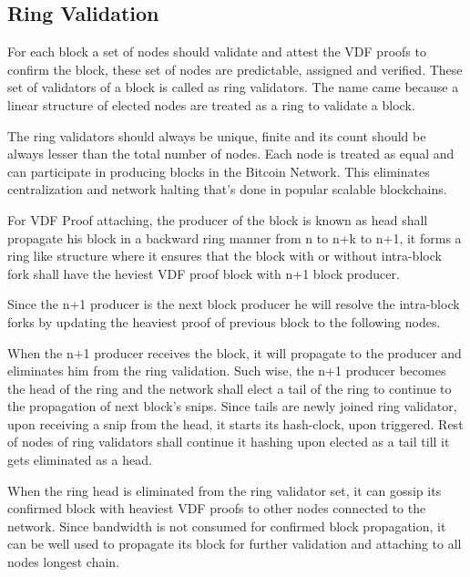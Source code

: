 \documentclass[../Bitcoin Blink.tex]{subfiles}
\begin{document}
\normalsize
\subsection{Ring Validation}

For each block a set of nodes should validate and attest the VDF proofs to confirm the block, these set of nodes are predictable, assigned and verified. These set of validators of a block is called as ring validators. The name came because a linear structure of elected nodes are treated as a ring to validate a block.

The ring validators should always be unique, finite and its count should be always lesser than the total number of nodes. Each node is treated as equal and can participate in producing blocks in the Bitcoin Network. This eliminates centralization and network halting that's done in popular scalable blockchains.

For VDF Proof attaching, the producer of the block is known as head shall propagate his block in a backward ring manner from n to n+k to n+1, it forms a ring like structure where it ensures that the block with or without intra-block fork shall have the heviest VDF proof block with n+1 block producer.

Since the n+1 producer is the next block producer he will resolve the intra-block forks by updating the heaviest proof of previous block to the following nodes.

When the n+1 producer receives the block, it will propagate to the producer and eliminates him from the ring validation. Such wise, the n+1 producer becomes the head of the ring and the network shall elect a tail of the ring to continue to the propagation of next block's snips. Since tails are newly joined ring validator, upon receiving a snip from the head, it starts its hash-clock, upon triggered. Rest of nodes of ring validators shall continue it hashing upon elected as a tail till it gets eliminated as a head.

When the ring head is eliminated from the ring validator set, it can gossip its confirmed block with heaviest VDF proofs to other nodes connected to the network. Since bandwidth is not consumed for confirmed block propagation, it can be well used to propagate its block for further validation and attaching to all nodes longest chain. 
\end{document}
